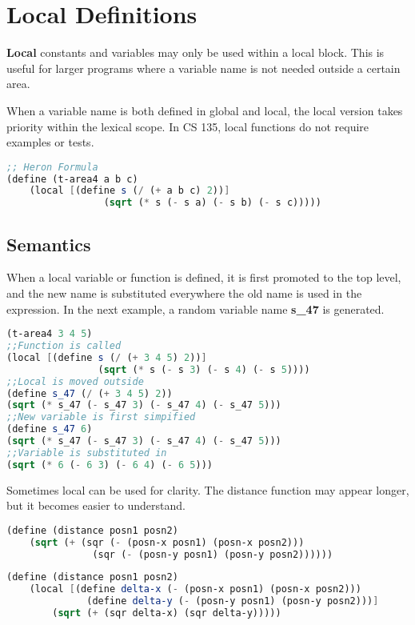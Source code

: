 \documentclass[english, 12pt]{article}
\begin{document}
\section{Local Definitions}
\begin{defn}
\textbf{Local} constants and variables may only be used within a local block. This is useful for larger programs where a variable name is not needed outside a certain area. 
\begin{note}
When a variable name is both defined in global and local, the local version takes priority within the lexical scope. In CS 135, local functions do not require examples or tests.
\end{note}
\begin{lstlisting}[language=Scheme]
;; Heron Formula
(define (t-area4 a b c)
	(local [(define s (/ (+ a b c) 2))]
				 (sqrt (* s (- s a) (- s b) (- s c)))))
\end{lstlisting}
\subsection{Semantics}
When a local variable or function is defined, it is first promoted to the top level, and the new name is substituted everywhere the old name is used in the expression. In the next example, a random variable name \textbf{s\_47} is generated.
\begin{lstlisting}[language=Scheme]
(t-area4 3 4 5) 
;;Function is called
(local [(define s (/ (+ 3 4 5) 2))]
				(sqrt (* s (- s 3) (- s 4) (- s 5))))
;;Local is moved outside
(define s_47 (/ (+ 3 4 5) 2))
(sqrt (* s_47 (- s_47 3) (- s_47 4) (- s_47 5)))
;;New variable is first simpified
(define s_47 6)
(sqrt (* s_47 (- s_47 3) (- s_47 4) (- s_47 5)))
;;Variable is substituted in
(sqrt (* 6 (- 6 3) (- 6 4) (- 6 5)))
\end{lstlisting}
\end{defn}
\begin{exmp}
Sometimes local can be used for clarity. The distance function may appear longer, but it becomes easier to understand.
\begin{lstlisting}[language=Scheme]
(define (distance posn1 posn2)
	(sqrt (+ (sqr (- (posn-x posn1) (posn-x posn2)))
			   (sqr (- (posn-y posn1) (posn-y posn2))))))
\end{lstlisting}
\begin{lstlisting}[language=Scheme]
(define (distance posn1 posn2)
	(local [(define delta-x (- (posn-x posn1) (posn-x posn2)))
			  (define delta-y (- (posn-y posn1) (posn-y posn2)))]
		(sqrt (+ (sqr delta-x) (sqr delta-y)))))

\end{lstlisting}
\end{exmp}
\end{document}
